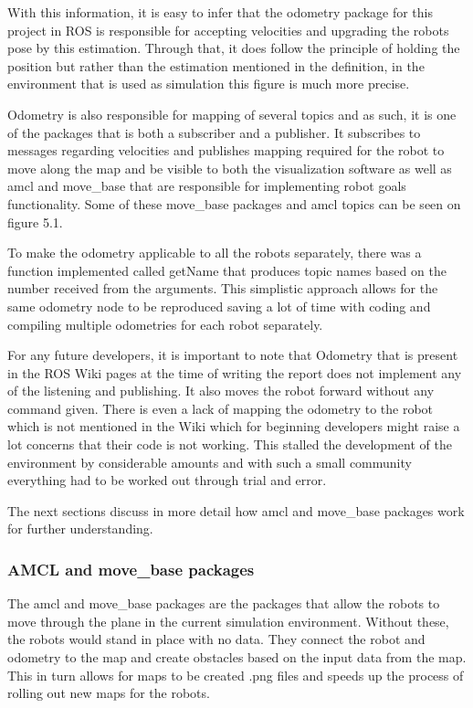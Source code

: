 \documentclass{report}
\begin{document}
        With this information, it is easy to infer that the odometry package for this project in ROS is responsible for accepting velocities and upgrading the robots pose by this estimation. Through that, it does follow the principle of holding the position but rather than the estimation mentioned in the definition, in the environment that is used as simulation this figure is much more precise.

        Odometry is also responsible for mapping of several topics and as such, it is one of the packages that is both a subscriber and a publisher. It subscribes to messages regarding velocities and publishes mapping required for the robot to move along the map and be visible to both the visualization software as well as amcl and move\_base that are responsible for implementing robot goals functionality. Some of these move\_base packages and amcl topics can be seen on figure 5.1.

        To make the odometry applicable to all the robots separately, there was a function implemented called getName that produces topic names based on the number received from the arguments. This simplistic approach allows for the same odometry node to be reproduced saving a lot of time with coding and compiling multiple odometries for each robot separately.

        For any future developers, it is important to note that Odometry that is present in the ROS Wiki pages at the time of writing the report does not implement any of the listening and publishing. It also moves the robot forward without any command given. There is even a lack of mapping the odometry to the robot which is not mentioned in the Wiki which for beginning developers might raise a lot concerns that their code is not working. This stalled the development of the environment by considerable amounts and with such a small community everything had to be worked out through trial and error.

        The next sections discuss in more detail how amcl and move\_base packages work for further understanding.

      \subsubsection{AMCL and move\_base packages}
        The amcl and move\_base packages are the packages that allow the robots to move through the plane in the current simulation environment. Without these, the robots would stand in place with no data. They connect the robot and odometry to the map and create obstacles based on the input data from the map. This in turn allows for maps to be created .png files and speeds up the process of rolling out new maps for the robots.
\end{document}
